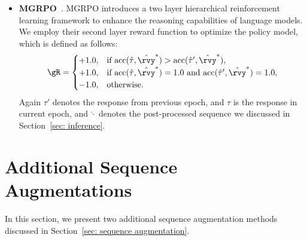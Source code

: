\begin{itemize}[noitemsep, topsep=-1pt, leftmargin=*]
    \item \textbf{MGRPO}~\cite{ding2025multi}. MGRPO introduces a two layer hierarchical reinforcement learning framework to enhance the reasoning capabilities of language models.
    We employ their second layer reward function to optimize the policy model, which is defined as follows:
    \begin{equation}
        \gR = \begin{cases}
            +1.0, & \text{if } \text{acc}(\hat{\tau}, \hat{\rvy}^*) >  \text{acc}(\hat{\tau}', \hat{\rvy}^*), \\
            +1.0, & \text{if } \text{acc}(\hat{\tau}, \hat{\rvy}^*) = 1.0 \text{ and } \text{acc}(\hat{\tau}', \hat{\rvy}^*) = 1.0, \\
            -1.0, & \text{otherwise}.
        \end{cases}
    \end{equation}
    Again $\tau'$ denotes the response from previous epoch, and $\tau$ is the response in current epoch, and $\hat{\cdot}$ denotes the post-processed sequence we discussed in Section~\ref{sec: inference}.
\end{itemize}


\section{Additional Sequence Augmentations}\label{app: sequence augmentation}

In this section, we present two additional sequence augmentation methods discussed in Section~\ref{sec: sequence augmentation}.





